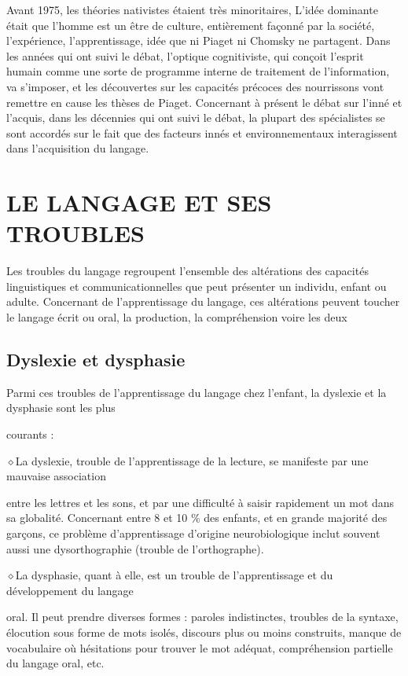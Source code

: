 Avant 1975, les théories nativistes étaient très minoritaires, L'idée dominante était que l’homme
est un être de culture, entièrement façonné par la société, l'expérience, l'apprentissage, idée que ni
Piaget ni Chomsky ne partagent. Dans les années qui ont suivi le débat, l'optique cognitiviste, qui
conçoit l'esprit humain comme une sorte de programme interne de traitement de l'information,
va s'imposer, et les découvertes sur les capacités précoces des nourrissons vont remettre en cause
les thèses de Piaget. Concernant à présent le débat sur l'inné et l'acquis, dans les décennies qui
ont suivi le débat, la plupart des spécialistes se sont accordés sur le fait que des facteurs innés et
environnementaux interagissent dans l'acquisition du langage.


\section{LE LANGAGE ET SES TROUBLES}
Les troubles du langage regroupent l'ensemble des altérations des capacités linguistiques et
communicationnelles que peut présenter un individu, enfant ou adulte. Concernant de l'apprentissage du
langage, ces altérations peuvent toucher le langage écrit ou oral, la production, la compréhension voire les
deux
\subsection{Dyslexie et dysphasie}

Parmi ces troubles de l'apprentissage du langage chez l'enfant, la dyslexie et la dysphasie sont les plus

courants :

\noindent\textcolor{BellaTeal}{$\diamond$}\enspace La dyslexie, trouble de l'apprentissage de la lecture, se manifeste par une mauvaise association\par
entre les lettres et les sons, et par une difficulté à saisir rapidement un mot dans sa globalité.
Concernant entre 8 et 10 \% des enfants, et en grande majorité des garçons, ce problème
d'apprentissage d’origine neurobiologique inclut souvent aussi une dysorthographie (trouble
de l'orthographe).

\noindent\textcolor{BellaTeal}{$\diamond$}\enspace La dysphasie, quant à elle, est un trouble de l'apprentissage et du développement du langage\par
oral. Il peut prendre diverses formes : paroles indistinctes, troubles de la syntaxe, élocution
sous forme de mots isolés, discours plus ou moins construits, manque de vocabulaire où
hésitations pour trouver le mot adéquat, compréhension partielle du langage oral, etc.


